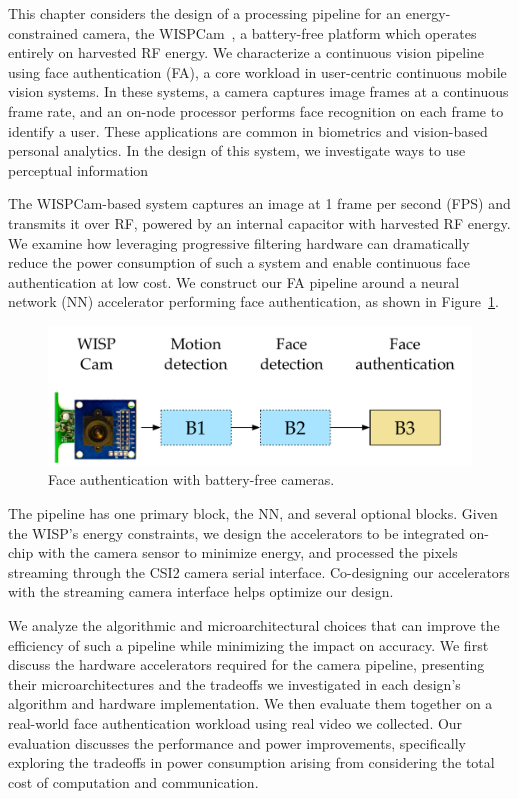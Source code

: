
\label{sec:nsp-face-auth}

This chapter considers the design of a processing pipeline for an energy-constrained camera, the WISPCam~\cite{wispcam}, a battery-free platform which operates entirely on harvested RF energy.
We characterize a continuous vision pipeline using face authentication (FA), a core workload in user-centric continuous mobile vision systems.
In these systems, a camera captures image frames at a continuous frame rate, and an on-node processor performs face recognition on each frame to identify a user.
These applications are common in biometrics and vision-based personal analytics.
In the design of this system, we investigate ways to use perceptual information


The WISPCam-based system captures an image at 1 frame per second (FPS) and transmits it over RF, powered by an internal capacitor with harvested RF energy.
We examine how leveraging progressive filtering hardware can dramatically reduce the power consumption of such a system and enable continuous face authentication at low cost.
We construct our FA pipeline around a neural network (NN) accelerator performing face authentication, as shown in Figure~\ref{fig:face_recog_pipeline_solution}.


\begin{figure}
  \centering
  \includegraphics[width=.6\textwidth]{nsp-figs/FA_pipeline_base_with_example.pdf}
  \caption{Face authentication with battery-free cameras. }
  \label{fig:face_recog_pipeline_solution}
\end{figure}

The pipeline has one primary block, the NN, and several optional blocks.
Given the WISP's energy constraints, we design the accelerators to be integrated on-chip with the camera sensor to minimize energy, and processed the pixels streaming through the CSI2 camera serial interface.
Co-designing our accelerators with the streaming camera interface helps optimize our design.

We analyze the algorithmic and microarchitectural choices that can improve the efficiency of such a pipeline while minimizing the impact on accuracy.
We first discuss the hardware accelerators required for the camera pipeline, presenting their microarchitectures and the tradeoffs we investigated in each design's algorithm and hardware implementation.
We then evaluate them together on a real-world face authentication workload using real video we collected.
Our evaluation discusses the performance and power improvements, specifically exploring the tradeoffs in power consumption arising from considering the total cost of computation and communication.


